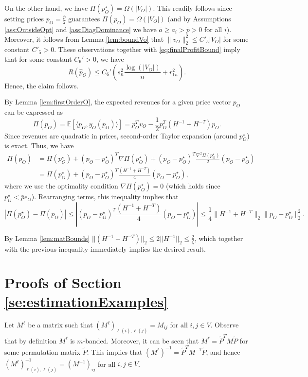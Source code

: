 \documentclass[opre,nonblindrev]{informs3} %
\begin{document}
\begin{APPENDIX}{}
   On the other hand, we have
   $\Pi({p}_O^\star)=\Omega(|V_O|)$.
   This readily  follows
   since setting prices ${p}_O=\frac{\bar{p}}{2}$ guarantees
   $\Pi({p}_O) = \Omega(|V_O|)$ (and by Assumptions \ref{ass:OutsideOpt}
   and \ref{ass:DiagDominance}
   we have $\bar{a} \geq  a_i>\bar{p}>0$ for all $i$).
   Moreover, it follows from Lemma \ref{lem:boundVo} that $\|{v}_O \|_2^2 \leq C'_5 |V_O|$ for some constant $C'_5>0$.
   These observations together with
   \eqref{eq:finalProfitBound} imply that
   for some constant $C_6'>0$, we have
   \[R(\hat{{p}}_O)\leq
  C_6'\left(
   s_n^2  \frac{\log(|V_O|)}{n} +  r_{1n}^2 \right)
   .\]
   Hence, the claim follows.
   \hfill
   \halmos
   \endproof	

   \noindent{}
By Lemma \ref{lem:firstOrderO}, the expected revenues for a given price vector ${p}_O$ can be expressed as 
   \[
   \Pi({p}_O)= \mathbb{E} [ \langle {p}_O, {y}_O({p}_O)\rangle]=
   {p}_O^T {v}_O- \frac{1}{2} {p}_O^T(H^{-1}+H^{-T}) {p}_O.
   \]
   Since revenues are quadratic in prices, second-order Taylor expansion (around ${p}_O^\star$) is exact. Thus, we have
   \begin{equation}
   \begin{aligned}
   \Pi({p}_O) &=  \Pi({p}_O^\star) + ({p}_O - {p}_O^\star)^T \nabla \Pi({p}_O^\star) +
   ({p}_O - {p}_O^\star)^T \frac{\nabla^2 \Pi({p}_O^\star)}{2}
   ({p}_O - {p}_O^\star) \\
   &= \Pi({p}_O^\star) +
   ({p}_O - {p}_O^\star)^T \frac{(H^{-1}+H^{-T}) }{4}
   ({p}_O - {p}_O^\star),
   \end{aligned}
   \end{equation}
   where we use the optimality condition $\nabla \Pi({p}_O^\star)=0$ (which holds since ${p}_O^\star< \bar{p}{e}_O$).
   Rearranging terms, this inequality implies that
   \[
   |\Pi({p}_O^\star) - \Pi({p}_O)| \leq
   \left| ({p}_O - {p}_O^\star)^T \frac{(H^{-1}+H^{-T}) }{4}
   ({p}_O - {p}_O^\star) \right|
   \leq \frac{1}{4}  \| H^{-1}+H^{-T} \|_2 \|{p}_O - {p}_O^\star\|_2^2.
   \]

   By Lemma   \ref{lem:matBounds}
   $||(H^{-1}+H^{-T})||_2\leq
   2||H^{-1}||_2 \leq \frac{2}{\zeta }$, which together with the previous inequality immediately implies the desired result.
   \hfill
   \halmos
   \endproof	




\section{Proofs of Section \ref{se:estimationExamples}} \label{ref:SecEstEx}
\noindent{}
Let $M^\ell$ be a matrix such that $(M^{\ell})_{\ell(i),\ell(j)}=M_{ij}$ for all $i,j\in V$. Observe that by definition $M^\ell$ is $m$-banded.
Moreover, it can be seen that
$M^\ell= \tilde{P}^T M \tilde{P}$ for some permutation matrix $\tilde{P}$.
This implies that $(M^\ell)^{-1}=  \tilde{P}^T M^{-1} \tilde{P}$, and hence $(M^\ell)^{-1}_{\ell(i),\ell(j)}=(M^{-1})_{ij}$ for all $i,j \in V$.


\end{APPENDIX}
\end{document}
